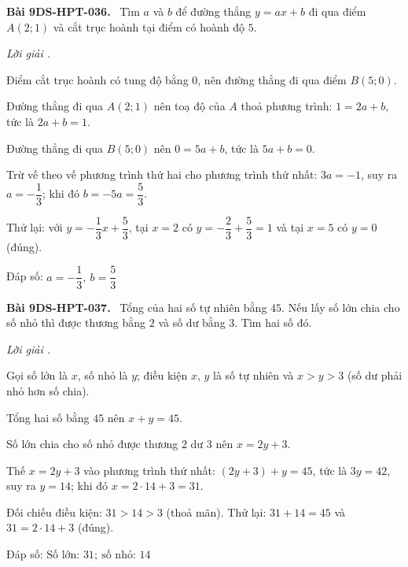 \documentclass[12pt,a4paper]{article}
\newenvironment{problem}[1][]{\par\medskip\noindent\textbf{Bài #1.}\ }{\par}
\newenvironment{solution}[1][]{\par\noindent\textit{Lời giải #1.}\par}{\par}
\begin{document}
\begin{problem}[9DS-HPT-036]
Tìm $a$ và $b$ để đường thẳng $y = ax + b$ đi qua điểm $A(2; 1)$ và cắt trục hoành tại điểm có hoành độ $5$.

\begin{solution}
Điểm cắt trục hoành có tung độ bằng $0$, nên đường thẳng đi qua điểm $B(5; 0)$.

Đường thẳng đi qua $A(2; 1)$ nên toạ độ của $A$ thoả phương trình: $1 = 2a + b$, tức là $2a + b = 1$.

Đường thẳng đi qua $B(5; 0)$ nên $0 = 5a + b$, tức là $5a + b = 0$.

Trừ vế theo vế phương trình thứ hai cho phương trình thứ nhất: $3a = -1$, suy ra $a = -\dfrac{1}{3}$; khi đó $b = -5a = \dfrac{5}{3}$.

Thử lại: với $y = -\dfrac{1}{3}x + \dfrac{5}{3}$, tại $x = 2$ có $y = -\dfrac{2}{3} + \dfrac{5}{3} = 1$ và tại $x = 5$ có $y = 0$ (đúng).

Đáp số: $\boxed{a = -\dfrac{1}{3},\ b = \dfrac{5}{3}}$
\end{solution}
\end{problem}

\begin{problem}[9DS-HPT-037]
Tổng của hai số tự nhiên bằng $45$. Nếu lấy số lớn chia cho số nhỏ thì được thương bằng $2$ và số dư bằng $3$. Tìm hai số đó.

\begin{solution}
Gọi số lớn là $x$, số nhỏ là $y$; điều kiện $x$, $y$ là số tự nhiên và $x > y > 3$ (số dư phải nhỏ hơn số chia).

Tổng hai số bằng $45$ nên $x + y = 45$.

Số lớn chia cho số nhỏ được thương $2$ dư $3$ nên $x = 2y + 3$.

Thế $x = 2y + 3$ vào phương trình thứ nhất: $(2y + 3) + y = 45$, tức là $3y = 42$, suy ra $y = 14$; khi đó $x = 2 \cdot 14 + 3 = 31$.

Đối chiếu điều kiện: $31 > 14 > 3$ (thoả mãn). Thử lại: $31 + 14 = 45$ và $31 = 2 \cdot 14 + 3$ (đúng).

Đáp số: $\boxed{\text{Số lớn: } 31;\ \text{số nhỏ: } 14}$
\end{solution}
\end{problem}
\end{document}
